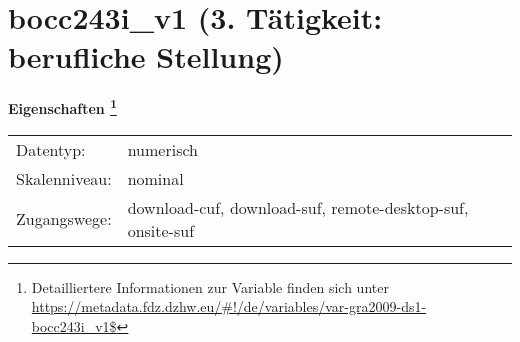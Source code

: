 
    \setcounter{footnote}{0}

    \vspace*{-1.8cm}
	\section{bocc243i\_v1 (3. Tätigkeit: berufliche Stellung)}
	\label{section:bocc243i_v1}



    \vspace*{0.5cm}
    \noindent\textbf{Eigenschaften
	\footnote{Detailliertere Informationen zur Variable finden sich unter
		\url{https://metadata.fdz.dzhw.eu/\#!/de/variables/var-gra2009-ds1-bocc243i_v1$}}}\\
	\begin{tabularx}{\hsize}{@{}lX}
	Datentyp: & numerisch \\
	Skalenniveau: & nominal \\
	Zugangswege: &
	  download-cuf, 
	  download-suf, 
	  remote-desktop-suf, 
	  onsite-suf
 \\
    \end{tabularx}



